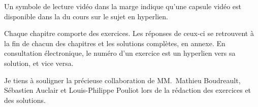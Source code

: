 Un symbole de lecture vidéo dans la marge indique qu'une capsule vidéo
est disponible dans la %
du cours sur le sujet en hyperlien.

Chaque chapitre comporte des exercices. Les réponses de ceux-ci se
retrouvent à la fin de chacun des chapitres et les solutions
complètes, en annexe. En consultation électronique, le numéro d'un
exercice est un hyperlien vers sa solution, et vice versa.

Je tiens à souligner la précieuse collaboration de MM.~Mathieu
Boudreault, Sébastien Auclair et Louis-Philippe Pouliot lors de la
rédaction des exercices et des solutions.

